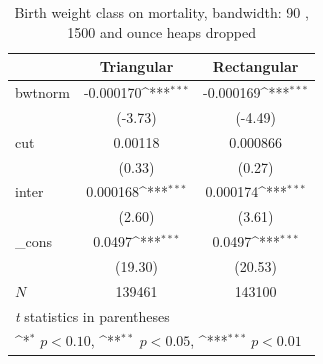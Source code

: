 \documentclass[a4paper,11pt]{article}
\begin{document}
\begin{table}[htbp]\centering
\def\sym#1{\ifmmode^{#1}\else\(^{#1}\)\fi}
\caption{Birth weight class on mortality, bandwidth: 90 , 1500 and ounce heaps dropped}
\label{B3.bw90}
\begin{tabular}{l*{2}{c}}
\hline\hline
            &\multicolumn{1}{c}{Triangular}&\multicolumn{1}{c}{Rectangular}\\
\hline
bwtnorm     &   -0.000170\sym{***}&   -0.000169\sym{***}\\
            &     (-3.73)         &     (-4.49)         \\
[1em]
cut         &     0.00118         &    0.000866         \\
            &      (0.33)         &      (0.27)         \\
[1em]
inter       &    0.000168\sym{***}&    0.000174\sym{***}\\
            &      (2.60)         &      (3.61)         \\
[1em]
\_cons      &      0.0497\sym{***}&      0.0497\sym{***}\\
            &     (19.30)         &     (20.53)         \\
\hline
\(N\)       &      139461         &      143100         \\
\hline\hline
\multicolumn{3}{l}{\footnotesize \textit{t} statistics in parentheses}\\
\multicolumn{3}{l}{\footnotesize \sym{*} \(p<0.10\), \sym{**} \(p<0.05\), \sym{***} \(p<0.01\)}\\
\end{tabular}
\end{table}


\end{document}
